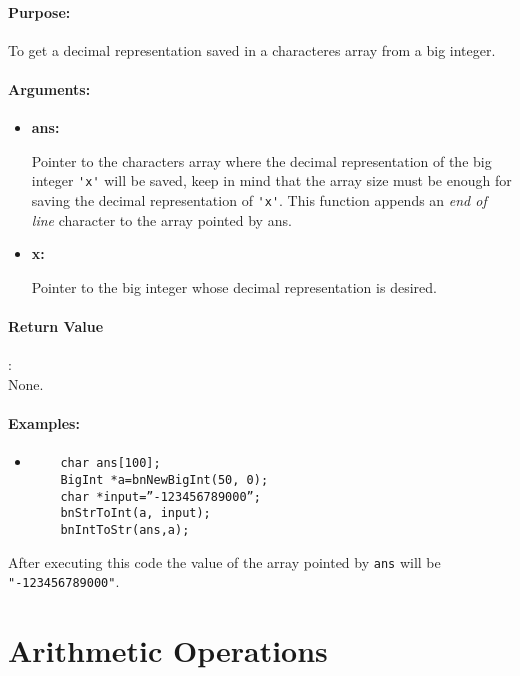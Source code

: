 \documentclass{book}
\begin{document}
\paragraph{Purpose:} 

To get a decimal representation saved in a characteres array from a big integer.

\paragraph{Arguments:}

\begin{itemize}
\item{\bf ans:}

Pointer to the characters array where the decimal representation of the big integer \verb+'x'+ will be saved, keep in mind that the array size must be enough for saving the decimal representation of \verb+'x'+. This  function appends an \emph{end of line} character to the array pointed by ans.

\item {\bf x:}

Pointer to the big integer whose decimal representation is desired.

\end{itemize}

\paragraph{Return Value}:\\

None.

\paragraph{Examples:}

\begin{itemize}
\item

\begin{verbatim}
	char ans[100];
	BigInt *a=bnNewBigInt(50, 0);
	char *input=”-123456789000”;
	bnStrToInt(a, input);
	bnIntToStr(ans,a);
\end{verbatim}
\end{itemize}

After executing this code the value of the array pointed by \verb+ans+ will be \verb+"-123456789000"+.

\section{Arithmetic Operations}
\end{document}

